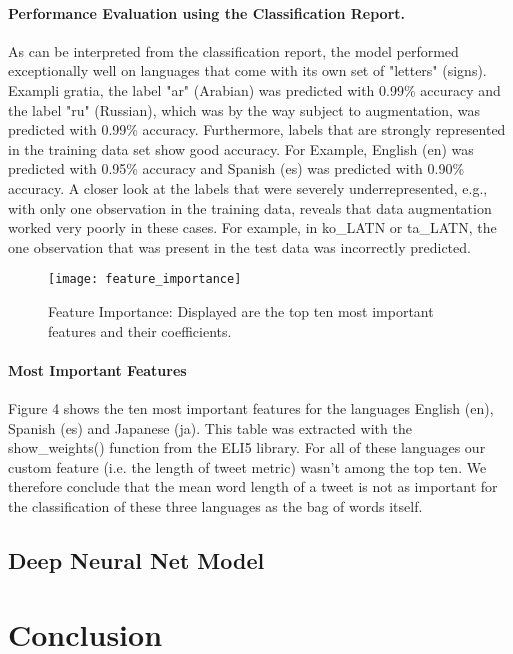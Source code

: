 \documentclass[fleqn,10pt]{SelfArx} %
\begin{document}
\paragraph{Performance Evaluation using the Classification Report.} As can be interpreted from the classification report, the model performed exceptionally well on languages that come with its own set of "letters" (signs). Exampli gratia, the label "ar" (Arabian) was predicted with 0.99\% accuracy and the label "ru" (Russian), which was by the way subject to augmentation, was predicted with 0.99\% accuracy. Furthermore, labels that are strongly represented in the training data set show good accuracy. For Example, English (en) was predicted with 0.95\% accuracy and Spanish (es) was predicted with 0.90\% accuracy. A closer look at the labels that were severely underrepresented, e.g., with only one observation in the training data, reveals that data augmentation worked very poorly in these cases. For example, in ko\_LATN or ta\_LATN, the one observation that was present in the test data was incorrectly predicted.

\begin{figure}[ht]\centering
	\texttt{[image: feature\_importance]}
	\caption{Feature Importance: Displayed are the top ten most important features and their coefficients.}
	\label{fig:results}
\end{figure}

\paragraph{Most Important Features} Figure 4 shows the ten most important features for the languages English (en), Spanish (es) and Japanese (ja). This table was extracted with the \linebreak show\_weights() function from the ELI5 library. For all of these languages our custom feature (i.e. the length of tweet metric) wasn't among the top ten. We therefore conclude that the mean word length of a tweet is not as important for the classification of these three languages as the bag of words itself.

\subsection{Deep Neural Net Model}


\section{Conclusion}
\end{document}

